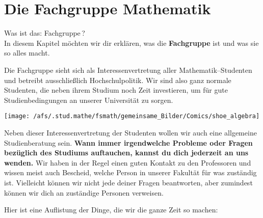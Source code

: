 \section{Die Fachgruppe Mathematik}

Was ist das: Fachgruppe\,?\\

In diesem Kapitel möchten wir dir erklären,
was die {\bf Fachgruppe} ist und was sie so alles macht.

Die Fachgruppe sieht sich als Interessenvertretung
aller Mathematik--Studenten und
betreibt ausschließlich \glqq Hochschulpolitik\grqq .
Wir sind also ganz normale Studenten,
die neben ihrem Studium noch Zeit investieren,
um für gute Studienbedingungen an unserer Universität zu sorgen.
\vspace*{1cm}
{
}
{
\begin{center}
\texttt{[image: /afs/.stud.mathe/fsmath/gemeinsame\_Bilder/Comics/shoe\_algebra]}
\end{center}
}

Neben dieser Interessenvertretung der Studenten
wollen wir auch eine allgemeine Studienberatung sein.
{\bf Wann immer irgendwelche Probleme oder Fragen
     bezüglich des Studiums auftauchen,
     kannst du dich jederzeit an uns wenden.} 
Wir haben in der Regel einen guten Kontakt zu den Professoren
und wissen meist auch Bescheid,
welche Person in unserer Fakultät für was zuständig ist.
Vielleicht können wir nicht jede deiner Fragen beantworten,
aber zumindest können wir dich an zuständige Personen verweisen.

Hier ist eine Auf\-listung der Dinge,
die wir die ganze Zeit so machen:


